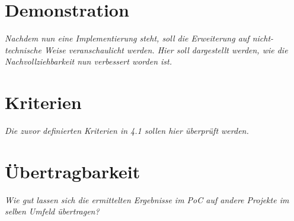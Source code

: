 
\section{Demonstration}
	\textit{Nachdem nun eine Implementierung steht, soll die Erweiterung auf nicht-technische Weise veranschaulicht werden. Hier soll dargestellt werden, wie die Nachvollziehbarkeit nun verbessert worden ist.}
\section{Kriterien}
	\textit{Die zuvor definierten Kriterien in 4.1 sollen hier überprüft werden.}
	
\section{Übertragbarkeit}
	\textit{Wie gut lassen sich die ermittelten Ergebnisse im PoC auf andere Projekte im selben Umfeld übertragen?}